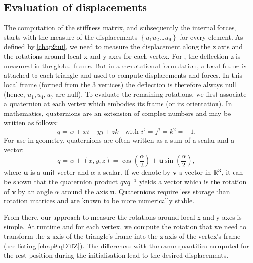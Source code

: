 	\subsection{Evaluation of displacements}
The computation of the stiffness matrix, and subsequently the internal forces, starts with the measure of the displacements $\left\{u_1 u_2 \ldots u_9 \right\} $ for every element. As defined by \eqref{chap9:ui}, we need to measure the displacement along the z axis and the rotations around local x and y axes for each vertex. For \cite{Przemieniecki85}, the deflection z is measured in the global frame. But in a co-rotational formulation, a local frame is attached to each triangle and used to compute displacements and forces. In this local frame (formed from the 3 vertices) the deflection is therefore always null (hence, $ u_1, u_4, u_7 $ are null). To evaluate the remaining rotations, we first associate a quaternion at each vertex which embodies its frame (or its orientation). In mathematics, quaternions are an extension of complex numbers and may be written as follows:
\begin{equation}
q = w + x i + y j + z k \quad \mbox{with } i^2 = j^2 = k^2 = -1.
\end{equation}
For use in geometry, quaternions are often written as a sum of a scalar and a vector:
\begin{equation}
q = w + (x, y, z) = \cos (\frac{\alpha}{2}) + \mathbf{u} \sin (\frac{\alpha}{2}),
\end{equation}
where $ \mathbf{u} $ is a unit vector and $ \alpha $ a scalar. If we denote by $ \mathbf{v} $ a vector in $\mathbb{R}^3$, it can be shown that the quaternion product $ q \mathbf{v} q^{-1} $ yields a vector which is the rotation of $ \mathbf{v} $ by an angle $ \alpha $ around the axis $ \mathbf{u} $. Quaternions require less storage than rotation matrices and are known to be more numerically stable. 

From there, our approach to measure the rotations around local x and y axes is simple. At runtime and for each vertex, we compute the rotation that we need to transform the z axis of the triangle's frame into the z axis of the vertex's frame (see listing \ref{chap9:qDiffZ}). The differences with the same quantities computed for the rest position during the initialisation lead to the desired displacements. 

